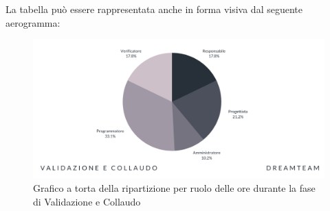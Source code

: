 La tabella può essere rappresentata anche in forma visiva dal seguente aerogramma:
\begin{figure}[H]
\centering
\includegraphics[scale=0.65]{Sezioni/SezioniPreventivo/grafici/Validazione_costi.png}
\caption{Grafico a torta della ripartizione per ruolo delle ore durante la fase di Validazione e Collaudo}
\end{figure}
